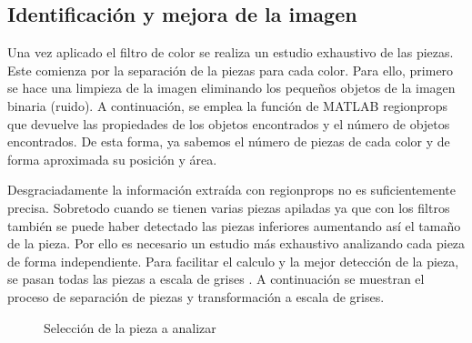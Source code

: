 \clearpage
\subsection{Identificación y mejora de la imagen}
Una vez aplicado el filtro de color se realiza un estudio exhaustivo de las piezas. Este comienza por la separación de la piezas para cada color. Para ello, primero se hace una limpieza de la imagen eliminando los pequeños objetos de la imagen binaria (ruido). A continuación, se emplea la función de MATLAB regionprops que devuelve las propiedades de los objetos encontrados y el número de objetos encontrados. De esta forma, ya sabemos el número de piezas de cada color y de forma aproximada su posición y área.

Desgraciadamente la información extraída con regionprops no es suficientemente precisa. Sobretodo cuando se tienen varias piezas apiladas ya que con los filtros también se puede haber detectado las piezas inferiores aumentando así el tamaño de la pieza. Por ello es necesario un estudio más exhaustivo analizando cada pieza de forma independiente. Para facilitar el calculo y la mejor detección de la pieza, se pasan todas las piezas a escala de grises \citep{greyscale}. A continuación se muestran el proceso de separación de piezas y transformación a escala de grises.

\begin{figure}[ht]  %
  \hfill	
  \hfill	
\caption{Selección de la pieza a analizar}
\label{fig:mejora1}
\vspace{-5pt}
\end{figure}

